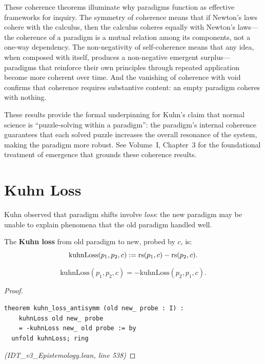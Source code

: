 \begin{interpretation}
These coherence theorems illuminate why paradigms function as effective frameworks
for inquiry. The symmetry of coherence means that if Newton's laws cohere with
the calculus, then the calculus coheres equally with Newton's laws---the coherence
of a paradigm is a mutual relation among its components, not a one-way dependency.
The non-negativity of self-coherence means that any idea, when composed with itself,
produces a non-negative emergent surplus---paradigms that reinforce their own
principles through repeated application become more coherent over time. And the
vanishing of coherence with void confirms that coherence requires substantive
content: an empty paradigm coheres with nothing.

These results provide the formal underpinning for Kuhn's claim that normal
science is ``puzzle-solving within a paradigm'': the paradigm's internal coherence
guarantees that each solved puzzle increases the overall resonance of the system,
making the paradigm more robust. See Volume~I, Chapter~3 for the foundational
treatment of emergence that grounds these coherence results.
\end{interpretation}


\section{Kuhn Loss}

Kuhn observed that paradigm shifts involve \emph{loss}: the new paradigm may be
unable to explain phenomena that the old paradigm handled well.

\begin{definition}
\label{def:kuhn-loss}
The \textbf{Kuhn loss} from old paradigm to new, probed by $c$, is:
\[
  \mathrm{kuhnLoss}(p_1, p_2, c) := \mathrm{rs}(p_1, c) - \mathrm{rs}(p_2, c).
\]
\end{definition}

\begin{theorem}
\label{thm:kuhn-loss-antisymm}
\[
  \mathrm{kuhnLoss}(p_1, p_2, c) = -\mathrm{kuhnLoss}(p_2, p_1, c).
\]
\end{theorem}

\begin{proof}
\begin{lstlisting}
theorem kuhn_loss_antisymm (old new_ probe : I) :
    kuhnLoss old new_ probe
    = -kuhnLoss new_ old probe := by
  unfold kuhnLoss; ring
\end{lstlisting}
\textit{(IDT\_v3\_Epistemology.lean, line 538)}
\end{proof}

